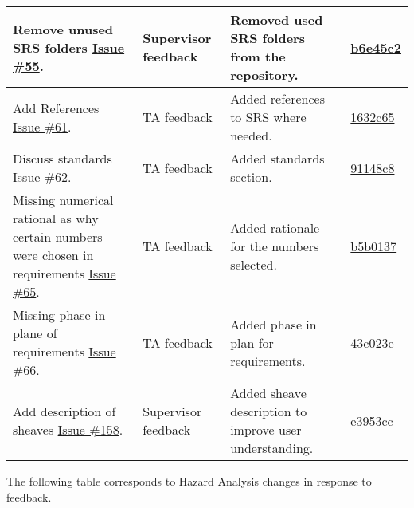 \documentclass{article}
\begin{document}
\begin{longtable}{|p{4cm}|p{1.5cm}|p{4cm}|p{1.5cm}|}
    \hline 
    Remove unused SRS folders \href{https://github.com/gr812b/CVT-Simulator/issues/55}{Issue \#55}. & Supervisor feedback & Removed used SRS folders from the repository. & 
    \href{https://github.com/gr812b/CVT-Simulator/commit/b6e45c22301071eea9360af5a45d437670bcf9a7}{b6e45c2}  \\
    \hline
    Add References \href{https://github.com/gr812b/CVT-Simulator/issues/61}{Issue \#61}. & TA feedback & Added references to SRS where needed. & 
    \href{https://github.com/gr812b/CVT-Simulator/commit/1632c65edd88ce7af866c39e77177310d6423657}{1632c65}  \\
    \hline 
    Discuss standards \href{https://github.com/gr812b/CVT-Simulator/issues/62}{Issue \#62}. & TA feedback & Added standards section. & 
    \href{https://github.com/gr812b/CVT-Simulator/commit/91148c8a8249d9964023fbcab5e4fcf92a940b2c}{91148c8} \\
    \hline
    Missing numerical rational as why certain numbers were chosen in requirements \href{https://github.com/gr812b/CVT-Simulator/issues/65}{Issue \#65}. & TA feedback & Added rationale for the numbers selected. & 
    \href{https://github.com/gr812b/CVT-Simulator/commit/b5b01370c77954ad1f6c25786c1e88eb61ef5a77}{b5b0137} \\
    \hline
    Missing phase in plane of requirements \href{https://github.com/gr812b/CVT-Simulator/issues/66}{Issue \#66}. & TA feedback & Added phase in plan for requirements. & 
    \href{https://github.com/gr812b/CVT-Simulator/commit/43c023e165f82a2f03926e7721ca326effeb52e47}{43c023e} \\
    \hline
    Add description of sheaves \href{https://github.com/gr812b/CVT-Simulator/issues/158}{Issue \#158}. & Supervisor feedback & Added sheave description to improve user understanding. & 
    \href{https://github.com/gr812b/CVT-Simulator/commit/e3953ccd60abfd192f6ebd23efa01e5a88108d30}{e3953cc}
    \end{longtable}


    \noindent The following table corresponds to Hazard Analysis changes in response to feedback.
\end{document}
